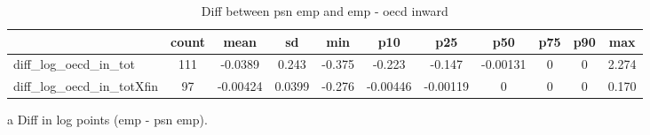 \begin{table}[h]\scriptsize\caption{Diff between psn emp and emp - oecd inward}\centering
\begin{threeparttable}\begin{tabular}{l*{10}c}\toprule
            &       count&        mean&          sd&         min&         p10&         p25&         p50&         p75&         p90&         max\\
\midrule
diff\_log\_oecd\_in\_tot&         111&     -0.0389&       0.243&      -0.375&      -0.223&      -0.147&    -0.00131&           0&           0&       2.274\\
diff\_log\_oecd\_in\_totXfin&          97&    -0.00424&      0.0399&      -0.276&    -0.00446&    -0.00119&           0&           0&           0&       0.170\\
\bottomrule\end{tabular}\begin{tablenotes}
\item[a] Diff in log points (emp - psn emp).
\end{tablenotes}\end{threeparttable}\end{table}
